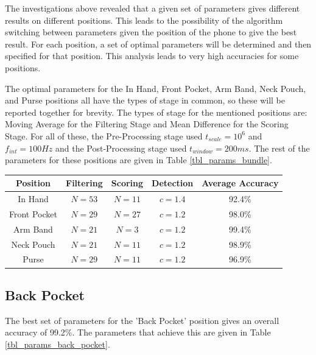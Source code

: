             The investigations above revealed that a given set of parameters gives different results on different positions. This leads to the possibility of the algorithm switching between parameters given the position of the phone to give the best result. For each position, a set of optimal parameters will be determined and then specified for that position. This analysis leads to very high accuracies for some positions.

            The optimal parameters for the In Hand, Front Pocket, Arm Band, Neck Pouch, and Purse positions all have the types of stage in common, so these will be reported together for brevity. The types of stage for the mentioned positions are: Moving Average for the Filtering Stage and Mean Difference for the Scoring Stage. For all of these, the Pre-Processing stage used $t_{scale} = 10^6$ and $f_{int} = 100Hz$ and the Post-Processing stage used $t_{window} = 200ms$. The rest of the parameters for these positions are given in Table \ref{tbl_params_bundle}.

            \begin{center}
                \label{tbl_params_bundle}
                \begin{tabular}{|c|c|c|c||c|}
                    \hline
                    Position & Filtering & Scoring & Detection & Average Accuracy \\
                    \hline
                    In Hand & $N=53$ & $N=11$ & $c=1.4$ & 92.4\% \\
                    Front Pocket & $N=29$ & $N=27$ & $c=1.2$ & 98.0\% \\
                    Arm Band & $N=21$ & $N=3$ & $c=1.2$ & 99.4\% \\
                    Neck Pouch & $N=21$ & $N=11$ & $c=1.2$ & 98.9\% \\
                    Purse & $N=29$ & $N=11$ & $c=1.2$ & 96.9\% \\
                    \hline
                \end{tabular}
            \end{center}  

            \subsection{Back Pocket}

                The best set of parameters for the 'Back Pocket' position gives an overall accuracy of 99.2\%. The parameters that achieve this are given in Table \ref{tbl_params_back_pocket}.


